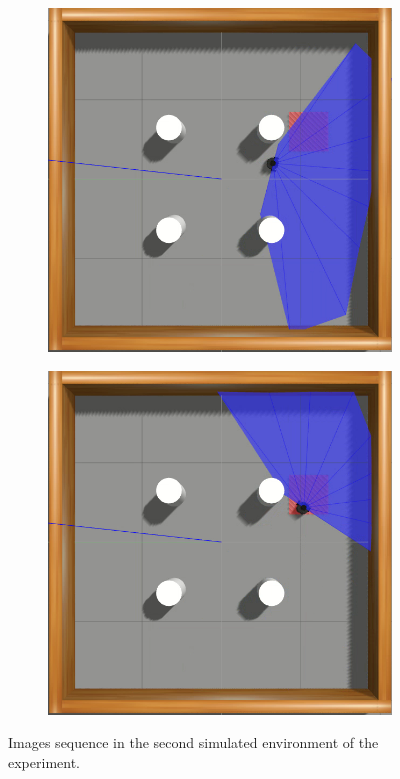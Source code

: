 \begin{figure}[htbp]
\begin{subfigure}[b]{0.115\textwidth}
    \end{subfigure}
    \hfill
    \begin{subfigure}[b]{0.115\textwidth}
        \includegraphics[width=\textwidth]{images/simenv2/7.png}
    \end{subfigure}
    \hfill
    \begin{subfigure}[b]{0.115\textwidth}
        \includegraphics[width=\textwidth]{images/simenv2/8.png}
    \end{subfigure}
    \caption{Images sequence in the second simulated environment of the experiment.}\label{fig:frames_simenv2}
\end{figure}

